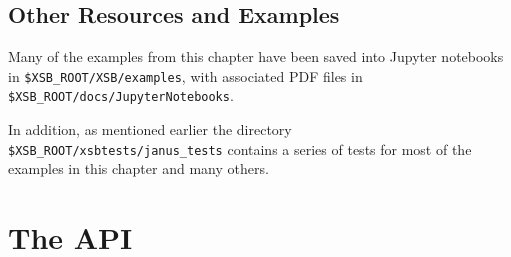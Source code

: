 
%
%
%

\subsection{Other \januspy{} Resources and Examples}

Many of the examples from this chapter have been saved into Jupyter
notebooks in {\tt \$XSB\_ROOT/XSB/examples}, with associated PDF files in
{\tt \$XSB\_ROOT/docs/JupyterNotebooks}.

In addition, as mentioned earlier the directory {\tt
  \$XSB\_ROOT/xsbtests/janus\_tests} contains a series of tests for
most of the examples in this chapter and many others.
\section{The \januspy{} API}

